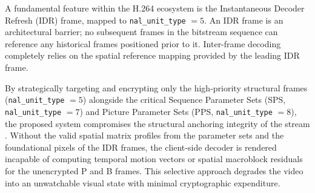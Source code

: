 A fundamental feature within the H.264 ecosystem is the Instantaneous Decoder Refresh (IDR) frame, mapped to \texttt{nal\_unit\_type} $= 5$. An IDR frame is an architectural barrier; no subsequent frames in the bitstream sequence can reference any historical frames positioned prior to it. Inter-frame decoding completely relies on the spatial reference mapping provided by the leading IDR frame. 

By strategically targeting and encrypting only the high-priority structural frames (\texttt{nal\_unit\_type} $= 5$) alongside the critical Sequence Parameter Sets (SPS, \texttt{nal\_unit\_type} $= 7$) and Picture Parameter Sets (PPS, \texttt{nal\_unit\_type} $= 8$), the proposed system compromises the structural anchoring integrity of the stream \cite{winkler2024selective}. Without the valid spatial matrix profiles from the parameter sets and the foundational pixels of the IDR frames, the client-side decoder is rendered incapable of computing temporal motion vectors or spatial macroblock residuals for the unencrypted P and B frames. This selective approach degrades the video into an unwatchable visual state with minimal cryptographic expenditure.
